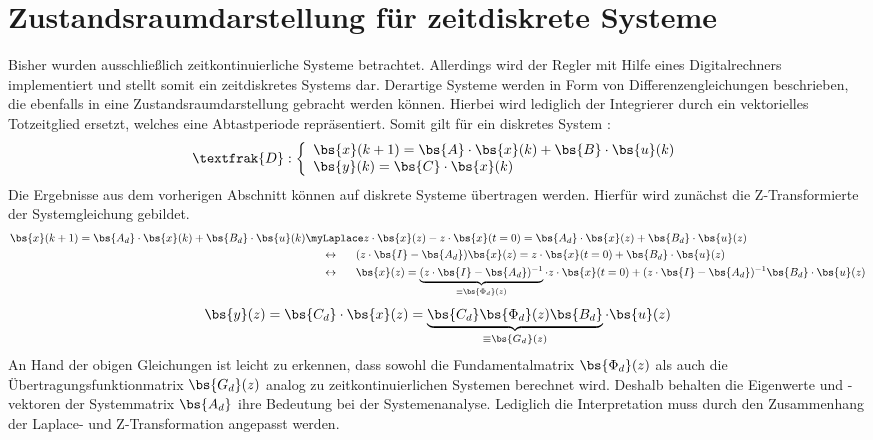 \section{Zustandsraumdarstellung für zeitdiskrete Systeme}
Bisher wurden ausschließlich zeitkontinuierliche Systeme betrachtet. Allerdings wird der Regler mit Hilfe eines Digitalrechners implementiert und stellt somit ein zeitdiskretes Systems dar. Derartige Systeme werden in Form von Differenzengleichungen beschrieben, die ebenfalls in eine Zustandsraumdarstellung gebracht werden können. Hierbei wird lediglich der Integrierer durch ein vektorielles Totzeitglied ersetzt, welches eine Abtastperiode repräsentiert. Somit gilt für ein diskretes System :
\begin{equation}
\textfrak{D} 
: \left\{ \begin{array}{ll}
\bs{{x}}(k+1) = \bs{A}\cdot \bs{x}(k) + \bs{B}\cdot \bs{u}(k) \\
\bs{y}(k) = \bs{C}\cdot \bs{x}(k)
\end{array}
\right.
\label{eq_discrete_ss}
\end{equation}
Die Ergebnisse aus dem vorherigen Abschnitt können auf diskrete Systeme übertragen werden. Hierfür wird zunächst die Z-Transformierte der Systemgleichung gebildet.
\begin{equation}
\begin{split}
\bs{x}(k+1) = \bs{A_d}\cdot \bs{x}(k)+\bs{B_d}\cdot \bs{u}(k) &\myLaplace z\cdot \bs{x}(z)-z\cdot \bs{x}(t=0) = \bs{A_d}\cdot \bs{x}(z) + \bs{B_d}\cdot \bs{u}(z)
\\
&\hspace{15pt}\leftrightarrow\hspace{15pt}
(z\cdot\bs{I}-\bs{A_d})\bs{x}(z) = z\cdot \bs{x}(t=0)+\bs{B_d}\cdot \bs{u}(z)
\\
&\hspace{15pt}\leftrightarrow\hspace{15pt}
\bs{x}(z) = \underbrace{(z\cdot\bs{I}-\bs{A_d})^{-1}}_{\equiv \bs{\Phi_d}(z)}\cdot z\cdot \bs{x}(t=0) + (z\cdot \bs{I}-\bs{A_d})^{-1}\bs{B_d}\cdot \bs{u}(z)
\end{split}
\end{equation}
\begin{equation}
\bs{y}(z) = \bs{C_d}\cdot \bs{x}(z) = \underbrace{\bs{C_d}\bs{\Phi_d}(z)\bs{B_d}}_{\equiv \bs{G_d}(z)}\cdot \bs{u}(z)
\end{equation}
An Hand der obigen Gleichungen ist leicht zu erkennen, dass sowohl die Fundamentalmatrix $\bs{\Phi_d}(z)$ als auch die Übertragungsfunktionmatrix $\bs{G_d}(z)$ analog zu zeitkontinuierlichen Systemen berechnet wird. Deshalb behalten die Eigenwerte und -vektoren der Systemmatrix $\bs{A_d}$ ihre Bedeutung bei der Systemenanalyse. Lediglich die Interpretation muss durch den Zusammenhang der Laplace- und Z-Transformation angepasst werden.
